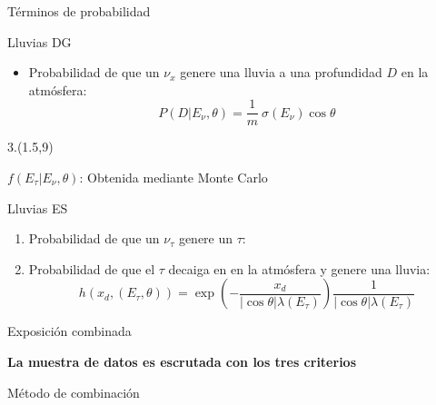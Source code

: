 % 
\begin{frame}{T\'erminos de probabilidad}
\footnotesize
 \begin{block}{Lluvias DG}
  \centering
	\begin{itemize}
	 \item Probabilidad de que un $\nu_x$ genere una lluvia a una profundidad $D$ en la atm\'osfera:
			$$
			P(D|E_{\nu},\theta) = \frac{1}{m}~\sigma(E_{\nu})\cos\theta
			$$
	\end{itemize}
 \end{block}
 
 \begin{textblock}{3.}(1.5,9)
  \scriptsize
  \begin{alertblock}{$f(E_\tau|E_\nu,\theta)$:}
  \centering
	Obtenida mediante Monte Carlo
  \end{alertblock}
 \end{textblock}
 
 \begin{block}{Lluvias ES}
  \begin{enumerate}
   \item Probabilidad de que un $\nu_\tau$ genere un $\tau$:
	\begin{center}
	\end{center}
   \item Probabilidad de que el $\tau$ decaiga en en la atm\'osfera y genere una lluvia:
   \begin{displaymath}
    h(x_d,(E_\tau,\theta))=
		\exp{\left(
		-\frac{x_d}{|\cos\theta|\lambda(E_\tau)}
		\right)}
		\frac{1}{|\cos\theta|\lambda(E_\tau)}
   \end{displaymath}
  \end{enumerate}
 \end{block}
\end{frame}



\begin{frame}{Exposici\'on combinada}
	\begin{alertblock}{}
		\begin{center}
			\textbf{La muestra de datos es escrutada con los tres criterios}
		\end{center}
	\end{alertblock}
	\begin{block}{M\'etodo de combinaci\'on}
		\begin{center}
		\end{center}
	\end{block}
\end{frame}

